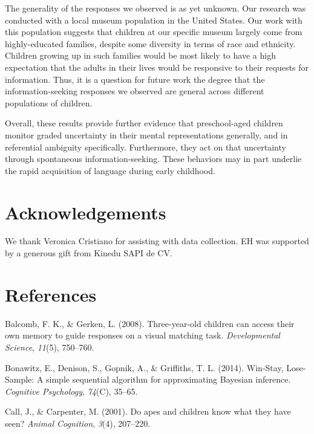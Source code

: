 \documentclass[english,,man]{apa6}
\begin{document}
The generality of the responses we observed is as yet unknown. Our
research was conducted with a local museum population in the United
States. Our work with this population suggests that children at our
specific museum largely come from highly-educated families, despite some
diversity in terms of race and ethnicity. Children growing up in such
families would be most likely to have a high expectation that the adults
in their lives would be responsive to their requests for information.
Thus, it is a question for future work the degree that the
information-seeking responses we observed are general across different
populations of children.

Overall, these results provide further evidence that preschool-aged
children monitor graded uncertainty in their mental representations
generally, and in referential ambiguity specifically. Furthermore, they
act on that uncertainty through spontaneous information-seeking. These
behaviors may in part underlie the rapid acquisition of language during
early childhood.

\section{Acknowledgements}\label{acknowledgements}

We thank Veronica Cristiano for assisting with data collection. EH was
supported by a generous gift from Kinedu SAPI de CV.

\section{References}\label{references}

\setlength{\parindent}{-0.1in} \setlength{\leftskip}{0.125in} \noindent

\hypertarget{refs}{}
\hypertarget{ref-Balcomb2008}{}
Balcomb, F. K., \& Gerken, L. (2008). Three-year-old children can access
their own memory to guide responses on a visual matching task.
\emph{Developmental Science}, \emph{11}(5), 750--760.

\hypertarget{ref-Bonawitz2014}{}
Bonawitz, E., Denison, S., Gopnik, A., \& Griffiths, T. L. (2014).
Win-Stay, Lose-Sample: A simple sequential algorithm for approximating
Bayesian inference. \emph{Cognitive Psychology}, \emph{74}(C), 35--65.

\hypertarget{ref-Call2001}{}
Call, J., \& Carpenter, M. (2001). Do apes and children know what they
have seen? \emph{Animal Cognition}, \emph{3}(4), 207--220.
\end{document}
